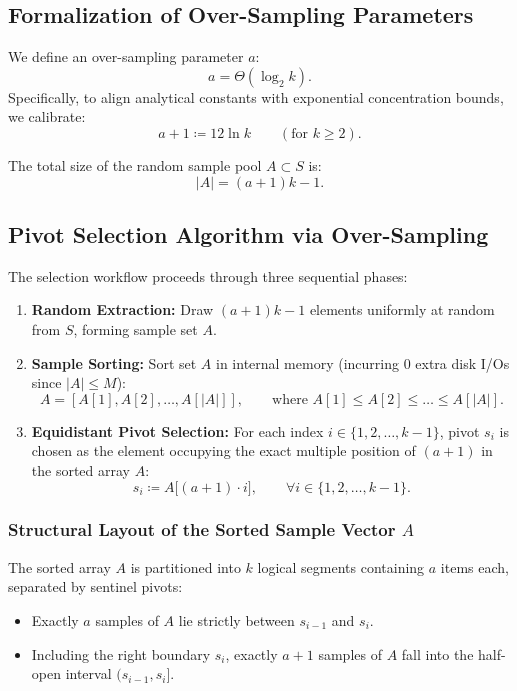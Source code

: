 \subsection{Formalization of Over-Sampling Parameters}
We define an over-sampling parameter $a$:
\begin{equation}
  a = \Theta(\log_2 k).
\end{equation}
Specifically, to align analytical constants with exponential concentration bounds, we calibrate:
\begin{equation}
  a + 1 \coloneqq 12 \ln k \qquad (\text{for } k \ge 2).
  \label{eq:oversampling-parameter-a}
\end{equation}

The total size of the random sample pool $A \subset S$ is:
\begin{equation}
  |A| = (a + 1)k - 1.
  \label{eq:sample-size-a}
\end{equation}

\subsection{Pivot Selection Algorithm via Over-Sampling}
The selection workflow proceeds through three sequential phases:
\begin{enumerate}
  \item \textbf{Random Extraction:} Draw $(a + 1)k - 1$ elements uniformly at random from $S$, forming sample set $A$.
  \item \textbf{Sample Sorting:} Sort set $A$ in internal memory (incurring 0 extra disk I/Os since $|A| \le M$):
  \begin{equation}
    A = [A[1], A[2], \dots, A[|A|]], \qquad \text{where } A[1] \le A[2] \le \dots \le A[|A|].
  \end{equation}
  \item \textbf{Equidistant Pivot Selection:} For each index $i \in \{1, 2, \dots, k - 1\}$, pivot $s_i$ is chosen as the element occupying the exact multiple position of $(a + 1)$ in the sorted array $A$:
  \begin{equation}
    s_i \coloneqq A\big[(a + 1) \cdot i\big], \qquad \forall i \in \{1, 2, \dots, k - 1\}.
    \label{eq:pivot-selection-rule}
  \end{equation}
\end{enumerate}

\subsubsection{Structural Layout of the Sorted Sample Vector \texorpdfstring{$A$}{A}}
The sorted array $A$ is partitioned into $k$ logical segments containing $a$ items each, separated by sentinel pivots:
\begin{itemize}
  \item Exactly $a$ samples of $A$ lie strictly between $s_{i-1}$ and $s_i$.
  \item Including the right boundary $s_i$, exactly $a + 1$ samples of $A$ fall into the half-open interval $(s_{i-1}, s_i]$.
\end{itemize}

